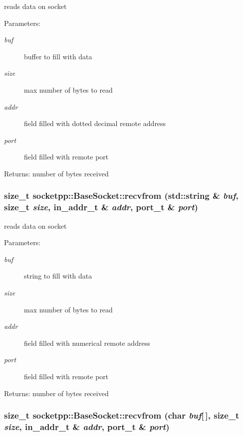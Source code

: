 reads data on socket 

\begin{Desc}
\item[Parameters:]
\begin{description}
\item[{\em buf}]buffer to fill with data \item[{\em size}]max number of bytes to read \item[{\em addr}]field filled with dotted decimal remote address \item[{\em port}]field filled with remote port \end{description}
\end{Desc}
\begin{Desc}
\item[Returns:]number of bytes received \end{Desc}
\hypertarget{classsocketpp_1_1BaseSocket_d2656c57d84c4ff032cd3d9ad4608bfa}{
\subsubsection[{recvfrom}]{\setlength{\rightskip}{0pt plus 5cm}size\_\-t socketpp::BaseSocket::recvfrom (std::string \& {\em buf}, \/  size\_\-t {\em size}, \/  in\_\-addr\_\-t \& {\em addr}, \/  {\bf port\_\-t} \& {\em port})}}
\label{classsocketpp_1_1BaseSocket_d2656c57d84c4ff032cd3d9ad4608bfa}


reads data on socket 

\begin{Desc}
\item[Parameters:]
\begin{description}
\item[{\em buf}]string to fill with data \item[{\em size}]max number of bytes to read \item[{\em addr}]field filled with numerical remote address \item[{\em port}]field filled with remote port \end{description}
\end{Desc}
\begin{Desc}
\item[Returns:]number of bytes received \end{Desc}
\hypertarget{classsocketpp_1_1BaseSocket_11ebe50d7ae76c21ef55d38cb87cc700}{
\subsubsection[{recvfrom}]{\setlength{\rightskip}{0pt plus 5cm}size\_\-t socketpp::BaseSocket::recvfrom (char {\em buf}\mbox{[}$\,$\mbox{]}, \/  size\_\-t {\em size}, \/  in\_\-addr\_\-t \& {\em addr}, \/  {\bf port\_\-t} \& {\em port})}}
\label{classsocketpp_1_1BaseSocket_11ebe50d7ae76c21ef55d38cb87cc700}


